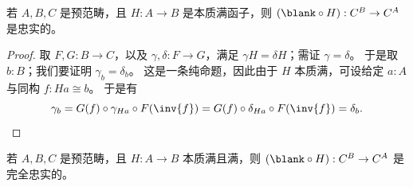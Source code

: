 \begin{lem}\label{ct:esosurj-postcomp-faithful}
  若 $A,B,C$ 是预范畴，且 $H:A\to B$ 是本质满函子，则 $(\blank\circ H):C^B \to C^A$ 是忠实的。
\end{lem}
\begin{proof}
  取 $F,G:B\to C$，以及 $\gamma,\delta:F\to G$，满足 $\gamma H = \delta H$；需证 $\gamma=\delta$。
  于是取 $b:B$；我们要证明 $\gamma_b=\delta_b$。
  这是一条纯命题，因此由于 $H$ 本质满，可设给定 $a:A$ 与同构 $f:Ha\cong b$。
  于是有
  \[ \gamma_b = G(f) \circ \gamma_{Ha} \circ F(\inv{f})
  = G(f) \circ \delta_{Ha} \circ F(\inv{f})
  = \delta_b.\qedhere
  \]
\end{proof}

\begin{lem}\label{ct:esofull-precomp-ff}
  若 $A,B,C$ 是预范畴，且 $H:A\to B$ 本质满且满，则 $(\blank\circ H):C^B \to C^A$ 是完全忠实的。
\end{lem}
